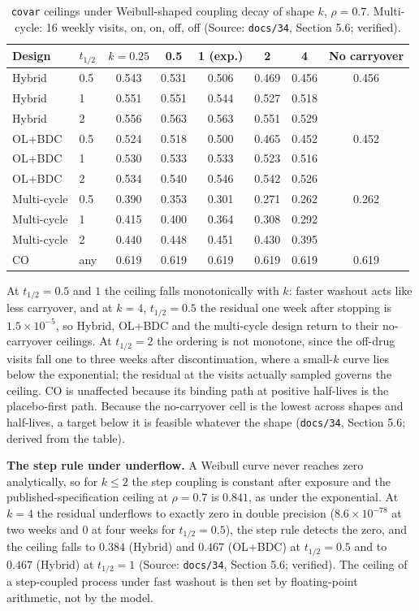 \documentclass[11pt]{article}
\newcommand{\code}[1]{\texttt{#1}}
\begin{document}
\begin{table}[h]
\centering\small
\caption{\code{covar} ceilings under Weibull-shaped coupling decay of
shape $k$, $\rho = 0.7$. Multi-cycle: 16 weekly visits, on, on, off,
off (Source: \code{docs/34}, Section 5.6; verified).}
\label{tab:inve-weibull}
\begin{tabular}{@{}llcccccc@{}}
\toprule
Design & $t_{1/2}$ & $k = 0.25$ & 0.5 & 1 (exp.) & 2 & 4 & No carryover \\
\midrule
Hybrid & 0.5 & 0.543 & 0.531 & 0.506 & 0.469 & 0.456 & 0.456 \\
Hybrid & 1   & 0.551 & 0.551 & 0.544 & 0.527 & 0.518 & \\
Hybrid & 2   & 0.556 & 0.563 & 0.563 & 0.551 & 0.529 & \\
OL+BDC & 0.5 & 0.524 & 0.518 & 0.500 & 0.465 & 0.452 & 0.452 \\
OL+BDC & 1   & 0.530 & 0.533 & 0.533 & 0.523 & 0.516 & \\
OL+BDC & 2   & 0.534 & 0.540 & 0.546 & 0.542 & 0.526 & \\
Multi-cycle & 0.5 & 0.390 & 0.353 & 0.301 & 0.271 & 0.262 & 0.262 \\
Multi-cycle & 1   & 0.415 & 0.400 & 0.364 & 0.308 & 0.292 & \\
Multi-cycle & 2   & 0.440 & 0.448 & 0.451 & 0.430 & 0.395 & \\
CO & any & 0.619 & 0.619 & 0.619 & 0.619 & 0.619 & 0.619 \\
\bottomrule
\end{tabular}
\end{table}

At $t_{1/2} = 0.5$ and $1$ the ceiling falls monotonically with $k$:
faster washout acts like less carryover, and at $k = 4$,
$t_{1/2} = 0.5$ the residual one week after stopping is
$1.5\times10^{-5}$, so Hybrid, OL+BDC and the multi-cycle design return
to their no-carryover ceilings. At $t_{1/2} = 2$ the ordering is not
monotone, since the off-drug visits fall one to three weeks after
discontinuation, where a small-$k$ curve lies below the exponential;
the residual at the visits actually sampled governs the ceiling. CO is
unaffected because its binding path at positive half-lives is the
placebo-first path. Because the no-carryover cell is the lowest across
shapes and half-lives, a target below it is feasible whatever the shape
(\code{docs/34}, Section 5.6; derived from the table).

\textbf{The step rule under underflow.} A Weibull curve never reaches
zero analytically, so for $k \le 2$ the step coupling is constant after
exposure and the published-specification ceiling at $\rho = 0.7$ is
$0.841$, as under the exponential. At $k = 4$ the residual underflows
to exactly zero in double precision ($8.6\times10^{-78}$ at two weeks
and $0$ at four weeks for $t_{1/2} = 0.5$), the step rule detects the
zero, and the ceiling falls to $0.384$ (Hybrid) and $0.467$ (OL+BDC) at
$t_{1/2} = 0.5$ and to $0.467$ (Hybrid) at $t_{1/2} = 1$ (Source:
\code{docs/34}, Section 5.6; verified). The ceiling of a step-coupled
process under fast washout is then set by floating-point arithmetic, not
by the model.
\end{document}
